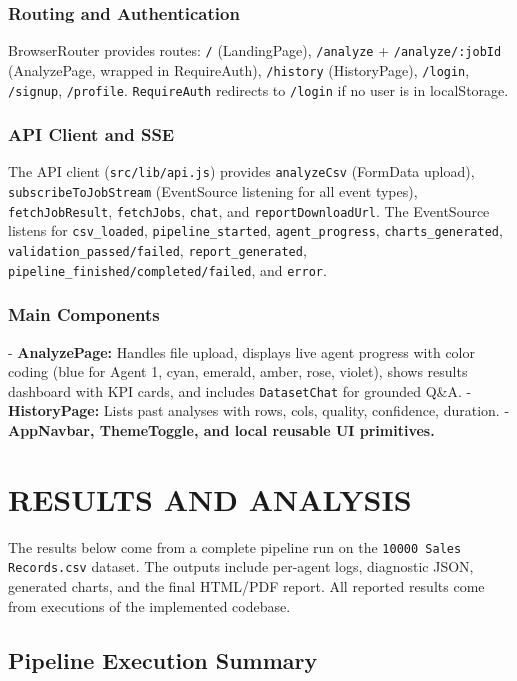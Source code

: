 \documentclass[12pt,a4paper,openany]{report}
\begin{document}
\subsection{Routing and Authentication}
BrowserRouter provides routes: \texttt{/} (LandingPage), \texttt{/analyze} + \texttt{/analyze/:jobId} (AnalyzePage, wrapped in RequireAuth), \texttt{/history} (HistoryPage), \texttt{/login}, \texttt{/signup}, \texttt{/profile}. \texttt{RequireAuth} redirects to \texttt{/login} if no user is in localStorage.

\subsection{API Client and SSE}
The API client (\texttt{src/lib/api.js}) provides \texttt{analyzeCsv} (FormData upload), \texttt{subscribeToJobStream} (EventSource listening for all event types), \texttt{fetchJobResult}, \texttt{fetchJobs}, \texttt{chat}, and \texttt{reportDownloadUrl}. The EventSource listens for \texttt{csv\_loaded}, \texttt{pipeline\_started}, \texttt{agent\_progress}, \texttt{charts\_generated}, \texttt{validation\_passed/failed}, \texttt{report\_generated}, \texttt{pipeline\_finished/completed/failed}, and \texttt{error}.

\subsection{Main Components}
- \textbf{AnalyzePage:} Handles file upload, displays live agent progress with color coding (blue for Agent 1, cyan, emerald, amber, rose, violet), shows results dashboard with KPI cards, and includes \texttt{DatasetChat} for grounded Q\&A.
- \textbf{HistoryPage:} Lists past analyses with rows, cols, quality, confidence, duration.
- \textbf{AppNavbar, ThemeToggle, and local reusable UI primitives.}

\chapter{RESULTS AND ANALYSIS}

The results below come from a complete pipeline run on the \texttt{10000 Sales Records.csv} dataset. The outputs include per-agent logs, diagnostic JSON, generated charts, and the final HTML/PDF report. All reported results come from executions of the implemented codebase.

\section{Pipeline Execution Summary}
\end{document}
